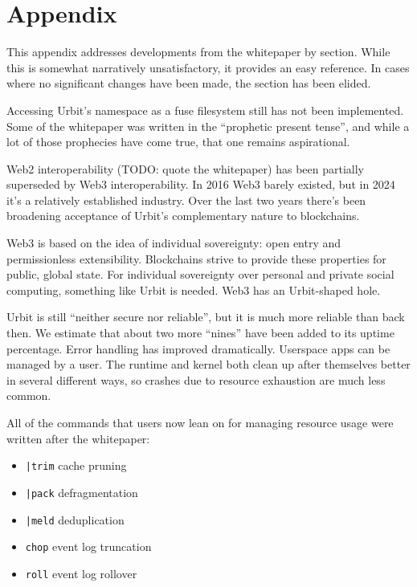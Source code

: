 \documentclass[twoside]{article}
\begin{document}
\section{Appendix}

This appendix addresses developments from the whitepaper by section.  While this is somewhat narratively unsatisfactory, it provides an easy reference.  In cases where no significant changes have been made, the section has been elided.

Accessing Urbit's namespace as a {\sc fuse} filesystem still has not been implemented.  Some of the whitepaper was written in the ``prophetic present tense'', and while a lot of those prophecies have come true, that one remains aspirational.

Web2 interoperability (TODO: quote the whitepaper) has been partially superseded by Web3 interoperability.  In 2016 Web3 barely existed, but in 2024 it's a relatively established industry.  Over the last two years there's been broadening acceptance of Urbit's complementary nature to blockchains. 

Web3 is based on the idea of individual sovereignty: open entry and permissionless extensibility.  Blockchains strive to provide these properties for public, global state.  For individual sovereignty over personal and private social computing, something like Urbit is needed.  Web3 has an Urbit-shaped hole.

Urbit is still ``neither secure nor reliable'', but it is much more reliable than back then.  We estimate that about two more ``nines'' have been added to its uptime percentage.  Error handling has improved dramatically.  Userspace apps can be managed by a user.  The runtime and kernel both clean up after themselves better in several different ways, so crashes due to resource exhaustion are much less common.

All of the commands that users now lean on for managing resource usage were written after the whitepaper:
\begin{itemize}
  \item  \lstinline[style=inlinecode]{|trim} cache pruning
  \item  \lstinline[style=inlinecode]{|pack} defragmentation
  \item  \lstinline[style=inlinecode]{|meld} deduplication
  \item  \lstinline[style=inlinecode]{chop} event log truncation
  \item  \lstinline[style=inlinecode]{roll} event log rollover
\end{itemize}
\end{document}
